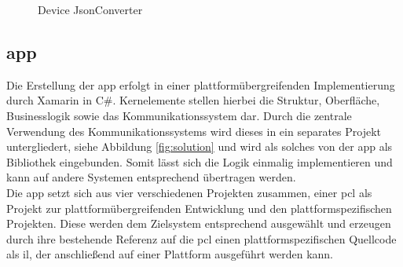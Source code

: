 \begin{figure}[h]
	\centering
	\qquad
	\caption{Device JsonConverter}
\end{figure}

\newpage
\subsection{\gls{app}}

Die Erstellung der \gls{app} erfolgt in einer plattformübergreifenden Implementierung durch Xamarin in C\#. Kernelemente stellen hierbei die Struktur, Oberfläche, Businesslogik sowie das Kommunikationssystem dar. Durch die zentrale Verwendung des Kommunikationssystems wird dieses in ein separates Projekt untergliedert, siehe Abbildung \eqref{fig:solution} und wird als solches von der \gls{app} als Bibliothek eingebunden. Somit lässt sich die Logik einmalig implementieren und kann auf andere Systemen entsprechend übertragen werden.\\
Die \gls{app} setzt sich aus vier verschiedenen Projekten zusammen, einer \acrshort{pcl} als Projekt zur plattformübergreifenden Entwicklung und den plattformspezifischen Projekten. Diese werden dem Zielsystem entsprechend ausgewählt und erzeugen durch ihre bestehende Referenz auf die \acrshort{pcl} einen plattformspezifischen Quellcode als \gls{il}, der anschließend auf einer Plattform ausgeführt werden kann.

